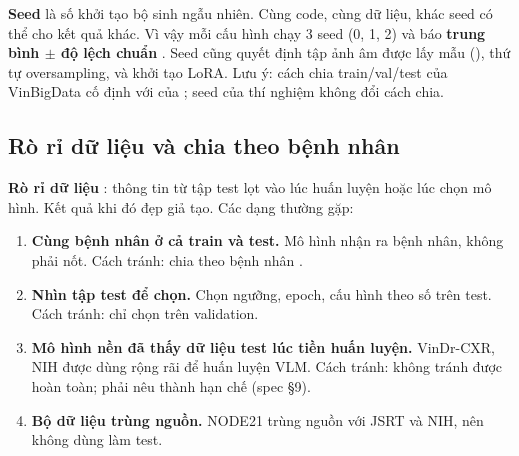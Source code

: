 \textbf{Seed} là số khởi tạo bộ sinh ngẫu nhiên. Cùng code, cùng dữ liệu, khác seed có thể cho kết quả khác.
Vì vậy mỗi cấu hình chạy 3 seed (0, 1, 2) và báo \textbf{trung bình $\pm$ độ lệch chuẩn} .
Seed cũng quyết định tập ảnh âm được lấy mẫu (), thứ tự oversampling, và khởi tạo LoRA.
Lưu ý: cách chia train/val/test của VinBigData cố định với  của ; seed của thí nghiệm không đổi cách chia.

\subsection{Rò rỉ dữ liệu và chia theo bệnh nhân}
\label{sec:leakage}

\textbf{Rò rỉ dữ liệu} : thông tin từ tập test lọt vào lúc huấn luyện hoặc lúc chọn mô hình. Kết quả khi đó đẹp giả tạo. Các dạng thường gặp:

\begin{enumerate}
\item \textbf{Cùng bệnh nhân ở cả train và test.} Mô hình nhận ra bệnh nhân, không phải nốt. Cách tránh: chia theo bệnh nhân .
\item \textbf{Nhìn tập test để chọn.} Chọn ngưỡng, epoch, cấu hình theo số trên test. Cách tránh: chỉ chọn trên validation.
\item \textbf{Mô hình nền đã thấy dữ liệu test lúc tiền huấn luyện.} VinDr-CXR, NIH được dùng rộng rãi để huấn luyện VLM. Cách tránh: không tránh được hoàn toàn; phải nêu thành hạn chế (spec §9).
\item \textbf{Bộ dữ liệu trùng nguồn.} NODE21 trùng nguồn với JSRT và NIH, nên không dùng làm test.
\end{enumerate}

